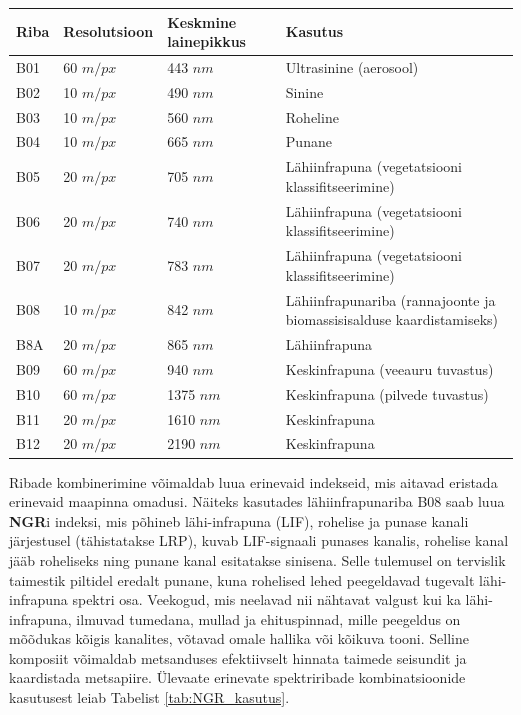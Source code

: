 \begin{table}[H]
\caption{Sentinel-2 MSI spektriribad ja nende kasutusvaldkonnad \cite{S2Mission}.}
\label{tab:s2bands}
\begin{longtable}{p{1cm}p{1.6cm}p{1.6cm}p{9cm}}
    \hline
    Riba & Resolutsioon & Keskmine lainepikkus & Kasutus                          \\ 
    \hline
    B01  & 60 $m/px$      & 443 $nm$ & Ultrasinine (aerosool)           \\
    B02  & 10 $m/px$      & 490 $nm$ & Sinine                           \\
    B03  & 10 $m/px$      & 560 $nm$ & Roheline                         \\
    B04  & 10 $m/px$      & 665 $nm$ & Punane                           \\
    B05  & 20 $m/px$      & 705 $nm$ & Lähiinfrapuna (vegetatsiooni klassifitseerimine) \\
    B06  & 20 $m/px$      & 740 $nm$ & Lähiinfrapuna (vegetatsiooni klassifitseerimine) \\
    B07  & 20 $m/px$      & 783 $nm$ & Lähiinfrapuna (vegetatsiooni klassifitseerimine) \\
    B08  & 10 $m/px$      & 842 $nm$ & Lähiinfrapunariba (rannajoonte ja biomassisisalduse kaardistamiseks) \\
    B8A  & 20 $m/px$      & 865 $nm$ & Lähiinfrapuna  \\
    B09  & 60 $m/px$      & 940 $nm$ & Keskinfrapuna (veeauru tuvastus)                       \\
    B10  & 60 $m/px$      & 1375 $nm$ & Keskinfrapuna (pilvede tuvastus)                      \\
    B11  & 20 $m/px$      & 1610 $nm$ & Keskinfrapuna       \\
    B12  & 20 $m/px$      & 2190 $nm$ & Keskinfrapuna       \\
    \hline
\end{longtable}
\end{table}
\addtocounter{table}{-1}

Ribade kombinerimine võimaldab luua erinevaid indekseid, mis aitavad
eristada erinevaid maapinna omadusi. Näiteks kasutades lähiinfrapunariba B08 saab luua \textbf{NGR}i indeksi, mis põhineb lähi-infrapuna (LIF), rohelise ja punase kanali järjestusel (tähistatakse LRP), kuvab LIF-signaali punases kanalis, rohelise kanal jääb roheliseks ning punane kanal esitatakse sinisena. Selle tulemusel on tervislik taimestik piltidel eredalt punane, kuna rohelised lehed peegeldavad tugevalt lähi-infrapuna spektri osa. Veekogud, mis neelavad nii nähtavat valgust kui ka lähi-infrapuna, ilmuvad tumedana, mullad ja ehituspinnad, mille peegeldus on mõõdukas kõigis kanalites, võtavad omale hallika või kõikuva tooni. Selline komposiit võimaldab metsanduses efektiivselt hinnata taimede seisundit ja kaardistada metsapiire. Ülevaate erinevate spektriribade kombinatsioonide kasutusest leiab Tabelist \ref{tab:NGR_kasutus}.

